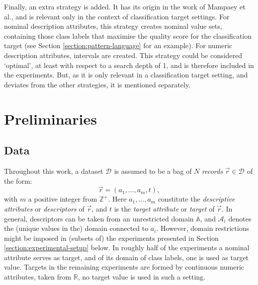 \documentclass[smallextended]{svjour3}
\newcommand{\ds}[1]{\mathcal{D}_{#1}}
\begin{document}
Finally, an extra strategy is added.
It has its origin in the work of Mampaey et al.\@ \cite{mampaey:2012,mampaey:2015}, and is relevant only in the context of classification target settings.
For nominal description attributes, this strategy creates nominal value sets, containing those class labels that maximise the quality score for the classification target (see Section \ref{section:pattern-language} for an example).
For numeric description attributes, intervals are created.
This strategy could be considered `optimal', at least with respect to a search depth of 1, and is therefore included in the experiments.
But, as it is only relevant in a classification target setting, and deviates from the other strategies, it is mentioned separately.





\section{Preliminaries}
\label{section:preliminaries}



\subsection{Data}
\label{section:data}

Throughout this work, a dataset $\ds{}$ is assumed to be a bag of $N$ \emph{records} $\vec{r} \in \ds{}$ of the form:
\begin{displaymath}
\vec{r} = \left(a_1, \ldots, a_m, t \right),
\end{displaymath} with $m$ a positive integer from $\mathbb{Z}^+$.
Here $a_1, \ldots, a_m$ constitute the \emph{descriptive attributes} or \emph{descriptors} of $\vec{r}$, and $t$ is the \emph{target attribute} or \emph{target} of $\vec{r}$.
In general, descriptors can be taken from an unrestricted domain $\mathbb{A}$, and $\mathcal{A}_i$ denotes the (unique values in the) domain connected to $a_i$.
However, domain restrictions might be imposed in (subsets of) the experiments presented in Section \ref{section:experimental-setup} below.
In roughly half of the experiments a nominal attribute serves as target, and of its domain of class labels, one is used as target value.
Targets in the remaining experiments are formed by continuous numeric attributes, taken from $\mathbb{R}$, no target value is used in such a setting.
\end{document}
